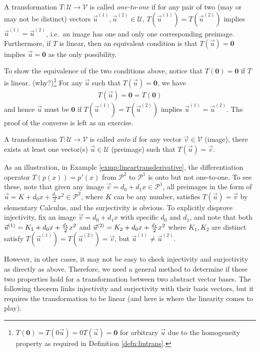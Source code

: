 \begin{defn}
\label{defn:injective}
A transformation $T: \mathcal{U} \to \mathcal{V}$ is called \textit{one-to-one} if for any pair of two (may or may not be distinct) vectors $\vec{u}^{(1)}, \vec{u}^{(2)} \in \mathcal{U}$, $T(\vec{u}^{(1)}) = T(\vec{u}^{(2)})$ implies $\vec{u}^{(1)} = \vec{u}^{(2)}$, i.e.\ an image has one and only one corresponding preimage. Furthermore, if $T$ is linear, then an equivalent condition is that $T(\vec{u}) = \textbf{0}$ implies $\vec{u} = \textbf{0}$ as the only possibility.
\end{defn}
To show the equivalence of the two conditions above, notice that $T(\textbf{0}) = \textbf{0}$ if $T$ is linear. (why?)\footnote{$T(\textbf{0})=T(0\vec{u})=0T(\vec{u})=\textbf{0}$ for arbitrary $\vec{u}$ due to the homogeneity property as required in Definition \ref{defn:lintrans}.} For any $\vec{u}$ such that $T(\vec{u}) = \textbf{0}$, we have
\begin{align*}
T(\vec{u}) = \textbf{0} = T(\textbf{0})
\end{align*}
and hence $\vec{u}$ must be $\textbf{0}$ if $T(\vec{u}^{(1)}) = T(\vec{u}^{(2)})$ implies $\vec{u}^{(1)} = \vec{u}^{(2)}$. The proof of the converse is left as an exercise.
\begin{defn}
\label{defn:surjective}
A transformation $T: \mathcal{U} \to \mathcal{V}$ is called \textit{onto} if for any vector $\vec{v} \in \mathcal{V}$ (image), there exists at least one vector(s) $\vec{u} \in \mathcal{U}$ (preimage) such that $T(\vec{u}) = \vec{v}$.
\end{defn}
As an illustration, in Example \ref{exmp:lineartransderivative}, the differentiation operator $T(p(x)) = p'(x)$ from $\mathcal{P}^2$ to $\mathcal{P}^1$ is onto but not one-to-one. To see these, note that given any image $\vec{v} = d_0 + d_1x \in \mathcal{P}^1$, all preimages in the form of $\vec{u} = K + d_0x + \frac{d_1}{2}x^2\in \mathcal{P}^2$, where $K$ can be any number, satisfies $T(\vec{u}) = \vec{v}$ by elementary Calculus, and the surjectivity is obvious. To explicitly disprove injectivity, fix an image $\vec{v} = d_0 + d_1x$ with specific $d_0$ and $d_1$, and note that both $\vec{u}^{(1)} = K_1 + d_0x + \smash{\frac{d_1}{2}}x^2$ and $\vec{u}^{(2)} = K_2 + d_0x + \smash{\frac{d_1}{2}}x^2$ where $K_1, K_2$ are distinct satisfy $T(\vec{u}^{(1)}) = T(\vec{u}^{(2)}) \allowbreak = \vec{v}$, but $\vec{u}^{(1)} \neq \vec{u}^{(2)}$.

However, in other cases, it may not be easy to check injectivity and surjectivity as directly as above. Therefore, we need a general method to determine if these two properties hold for a transformation between two abstract vector bases. The following theorem links injectivity and surjectivity with their basis vectors, but it requires the transformation to be linear (and here is where the linearity comes to play).

